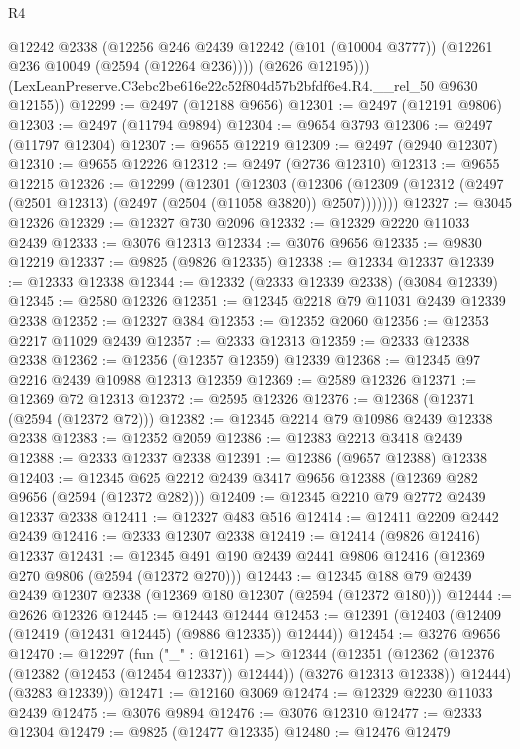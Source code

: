 \begin{lexlean}{R4}
\begin{coremodule}
          @12242
          @2338
          (@12256
            @246
            @2439
            @12242
            (@101 (@10004 @3777))
            (@12261 @236 @10049 (@2594 (@12264 @236))))
          (@2626 @12195)))
      (LexLeanPreserve.C3ebc2be616e22c52f804d57b2bfdf6e4.R4.__rel_50 @9630 @12155))
@12299 := @2497 (@12188 @9656)
@12301 := @2497 (@12191 @9806)
@12303 := @2497 (@11794 @9894)
@12304 := @9654 @3793
@12306 := @2497 (@11797 @12304)
@12307 := @9655 @12219
@12309 := @2497 (@2940 @12307)
@12310 := @9655 @12226
@12312 := @2497 (@2736 @12310)
@12313 := @9655 @12215
@12326 := @12299
    (@12301
      (@12303
        (@12306 (@12309 (@12312 (@2497 (@2501 @12313) (@2497 (@2504 (@11058 @3820)) @2507)))))))
@12327 := @3045 @12326
@12329 := @12327 @730 @2096
@12332 := @12329 @2220 @11033 @2439
@12333 := @3076 @12313
@12334 := @3076 @9656
@12335 := @9830 @12219
@12337 := @9825 (@9826 @12335)
@12338 := @12334 @12337
@12339 := @12333 @12338
@12344 := @12332 (@2333 @12339 @2338) (@3084 @12339)
@12345 := @2580 @12326
@12351 := @12345 @2218 @79 @11031 @2439 @12339 @2338
@12352 := @12327 @384
@12353 := @12352 @2060
@12356 := @12353 @2217 @11029 @2439
@12357 := @2333 @12313
@12359 := @2333 @12338 @2338
@12362 := @12356 (@12357 @12359) @12339
@12368 := @12345 @97 @2216 @2439 @10988 @12313 @12359
@12369 := @2589 @12326
@12371 := @12369 @72 @12313
@12372 := @2595 @12326
@12376 := @12368 (@12371 (@2594 (@12372 @72)))
@12382 := @12345 @2214 @79 @10986 @2439 @12338 @2338
@12383 := @12352 @2059
@12386 := @12383 @2213 @3418 @2439
@12388 := @2333 @12337 @2338
@12391 := @12386 (@9657 @12388) @12338
@12403 := @12345 @625 @2212 @2439 @3417 @9656 @12388 (@12369 @282 @9656 (@2594 (@12372 @282)))
@12409 := @12345 @2210 @79 @2772 @2439 @12337 @2338
@12411 := @12327 @483 @516
@12414 := @12411 @2209 @2442 @2439
@12416 := @2333 @12307 @2338
@12419 := @12414 (@9826 @12416) @12337
@12431 := @12345 @491 @190 @2439 @2441 @9806 @12416 (@12369 @270 @9806 (@2594 (@12372 @270)))
@12443 := @12345 @188 @79 @2439 @2439 @12307 @2338 (@12369 @180 @12307 (@2594 (@12372 @180)))
@12444 := @2626 @12326
@12445 := @12443 @12444
@12453 := @12391 (@12403 (@12409 (@12419 (@12431 @12445) (@9886 @12335)) @12444))
@12454 := @3276 @9656
@12470 := @12297
    (fun ("_" : @12161) =>
    @12344
      (@12351
        (@12362 (@12376 (@12382 (@12453 (@12454 @12337)) @12444)) (@3276 @12313 @12338))
        @12444)
      (@3283 @12339))
@12471 := @12160 @3069
@12474 := @12329 @2230 @11033 @2439
@12475 := @3076 @9894
@12476 := @3076 @12310
@12477 := @2333 @12304
@12479 := @9825 (@12477 @12335)
@12480 := @12476 @12479

\end{coremodule}
\end{lexlean}
